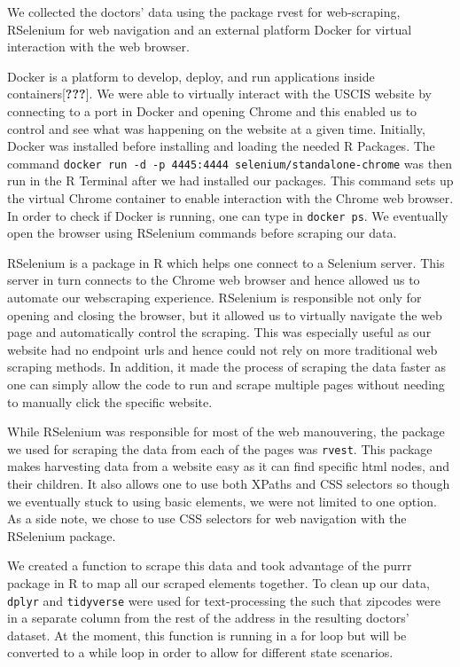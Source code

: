 \documentclass[10pt,letterpaper]{article}
\begin{document}
We collected the doctors' data using the package rvest for web-scraping,
RSelenium for web navigation and an external platform Docker for virtual
interaction with the web browser.

Docker is a platform to develop, deploy, and run applications inside
containers{[}{\textbf{???}}{]}. We were able to virtually interact with
the USCIS website by connecting to a port in Docker and opening Chrome
and this enabled us to control and see what was happening on the website
at a given time. Initially, Docker was installed before installing and
loading the needed R Packages. The command
\texttt{docker\ run\ -d\ -p\ 4445:4444\ selenium/standalone-chrome} was
then run in the R Terminal after we had installed our packages. This
command sets up the virtual Chrome container to enable interaction with
the Chrome web browser. In order to check if Docker is running, one can
type in \texttt{docker\ ps}. We eventually open the browser using
RSelenium commands before scraping our data.

RSelenium is a package in R which helps one connect to a Selenium
server. This server in turn connects to the Chrome web browser and hence
allowed us to automate our webscraping experience. RSelenium is
responsible not only for opening and closing the browser, but it allowed
us to virtually navigate the web page and automatically control the
scraping. This was especially useful as our website had no endpoint urls
and hence could not rely on more traditional web scraping methods. In
addition, it made the process of scraping the data faster as one can
simply allow the code to run and scrape multiple pages without needing
to manually click the specific website.

While RSelenium was responsible for most of the web manouvering, the
package we used for scraping the data from each of the pages was
\texttt{rvest}. This package makes harvesting data from a website easy
as it can find specific html nodes, and their children. It also allows
one to use both XPaths and CSS selectors so though we eventually stuck
to using basic elements, we were not limited to one option. As a side
note, we chose to use CSS selectors for web navigation with the
RSelenium package.

We created a function to scrape this data and took advantage of the
purrr package in R to map all our scraped elements together. To clean up
our data, \texttt{dplyr} and \texttt{tidyverse} were used for
text-processing the such that zipcodes were in a separate column from
the rest of the address in the resulting doctors' dataset. At the
moment, this function is running in a for loop but will be converted to
a while loop in order to allow for different state scenarios.
\end{document}
